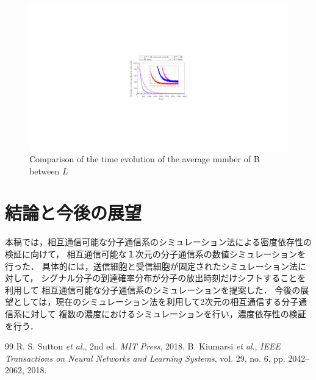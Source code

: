 \documentclass[twocolumn]{jarticle}
\begin{document}
\begin{figure}[tb]
    \centering
    \includegraphics[width=\columnwidth]{figures/step2_cost_fig.pdf}
    \caption{Comparison of the time evolution of the average number of B between $L$}
    \label{fig:simulation}
\end{figure}


\section{結論と今後の展望}
本稿では，相互通信可能な分子通信系のシミュレーション法による密度依存性の検証に向けて，
相互通信可能な１次元の分子通信系の数値シミュレーションを行った．
具体的には，送信細胞と受信細胞が固定されたシミュレーション法に対して，
シグナル分子の到達確率分布が分子の放出時刻だけシフトすることを利用して
相互通信可能な分子通信系のシミュレーションを提案した．
今後の展望としては，現在のシミュレーション法を利用して2次元の相互通信する分子通信系に対して
複数の濃度におけるシミュレーションを行い，濃度依存性の検証を行う．



\begin{thebibliography} {99}
     R. S. Sutton {\it et al}., %
    2nd ed. { \it MIT Press}, 2018.
     B. Kiumarsi {\it et al}., 
    {\it IEEE Transactions on Neural Networks and Learning Systems}, vol. 29, no. 6, pp. 2042–2062, 2018.
\end{thebibliography}
\end{document}
